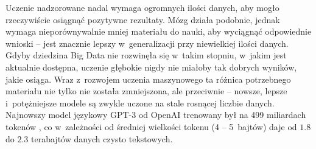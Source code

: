 Uczenie nadzorowane nadal wymaga ogromnych ilości danych, aby mogło rzeczywiście osiągnąć pozytywne rezultaty.
Mózg działa podobnie, jednak wymaga nieporównywalnie mniej materiału do nauki, aby wyciągnąć odpowiednie wnioski -- jest znacznie lepszy w~generalizacji przy niewielkiej ilości danych.
Gdyby dziedzina Big Data nie rozwinęła się w~takim stopniu, w~jakim jest aktualnie dostępna, uczenie głębokie nigdy nie miałoby tak dobrych wyników, jakie osiąga.
Wraz z~rozwojem uczenia maszynowego ta różnica potrzebnego materiału nie tylko nie została zmniejszona, ale przeciwnie -- nowsze, lepsze i~potężniejsze modele są zwykle uczone na stale rosnącej liczbie danych.
Najnowszy model językowy GPT-3 od OpenAI trenowany był na 499 miliardach tokenów \cite{brown2020language}, co w~zależności od średniej wielkości tokenu (4 -- 5~bajtów) \footnotemark daje od \(1.8\) do \(2.3\) terabajtów danych czysto tekstowych.

